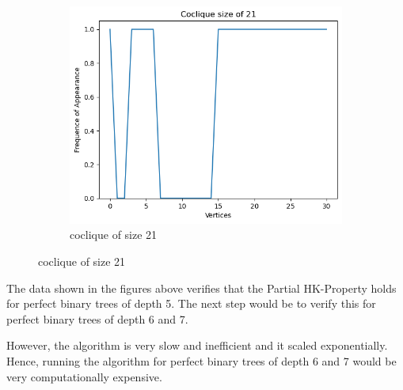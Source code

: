 \documentclass{amsart}
\theoremstyle{definition}
\begin{document}
\begin{appendix}
\begin{figure}[hbt!]
\begin{subfigure}[b]{.45\textwidth}
			\includegraphics[width=1\linewidth]{depth_5_size_21.png}
			\caption{coclique of size 21}
		\end{subfigure}
	\end{figure}

	The data shown in the figures above verifies that the Partial HK-Property holds for perfect binary trees of depth 5. The next step would be to verify this for perfect binary trees of depth 6 and 7.

	However, the algorithm is very slow and inefficient and it scaled exponentially. Hence, running the algorithm for perfect binary trees of depth 6 and 7 would be very computationally expensive.

\end{appendix}

\newpage





\end{document}
